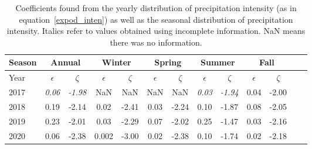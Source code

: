 \begin{table}[htb]
  \begin{center}
    \begin{tabular}{|l|*{11}{c|}r|}
      \hline
      Season    &       \multicolumn{2}{|c|}{Annual}          & \multicolumn{2}{|c|}{Winter}& \multicolumn{2}{|c|}{Spring}  & \multicolumn{2}{|c|}{Summer} &\multicolumn{2}{|c|}{Fall}  \\
      \hline
      Year      & $\epsilon $ & $\zeta$  &  $\epsilon $ & $\zeta$  &  $\epsilon $ & $\zeta$  &  $\epsilon $ & $\zeta$  & $\epsilon $ & $\zeta$ \\
      \hline
      2017      & \textit{0.06}  & \textit{-1.98}  & NaN & NaN & NaN & NaN & \textit{0.03}  & \textit{-1.94}  & 0.04  & -2.00  \\
      2018      & 0.19           & -2.14  & 0.02 & -2.41 & 0.03 & -2.24  & 0.10  & -1.87  & 0.08 & -2.05  \\
      2019      & 0.23           & -2.01  & 0.03 & -2.29 & 0.07 & -2.02 & 0.25 & -1.47 & 0.03 & -2.16  \\
      2020      & 0.06          & -2.38  & 0.002 & -3.00 & 0.02 & -2.38 & 0.10  & -1.74 & 0.02 & -2.18\\
      \hline
    \end{tabular}
  \end{center}
  \caption[Year comparison of coefficients for precipitation
    intensity] {\label{fourthtable}Coefficients found from the yearly
    distribution of precipitation intensity (as in equation~\ref{expod_inten}) as
    well as the seasonal distribution of precipitation
    intensity. Italics refer to values obtained using incomplete
    information. NaN means there was no information. }
\end{table}
